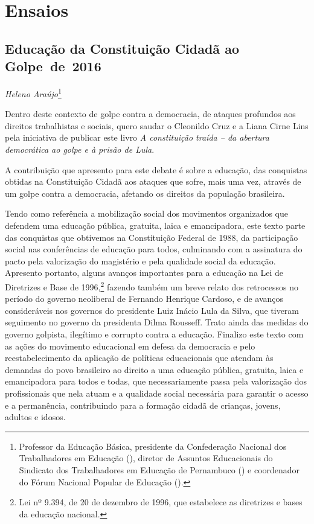 \part{Ensaios}

\chapter*{Educação da Constituição Cidadã ao Golpe~de~2016}


\begin{flushright}
\emph{Heleno Araújo}\footnote{Professor da Educação Básica, presidente da
  Confederação Nacional dos Trabalhadores em Educação (), diretor
  de Assuntos Educacionais do Sindicato dos Trabalhadores em Educação de
  Pernambuco () e coordenador do Fórum Nacional Popular de
  Educação ().}
\end{flushright}

Dentro deste contexto de golpe contra a democracia, de ataques profundos
aos direitos trabalhistas e sociais, quero saudar o Cleonildo Cruz e a
Liana Cirne Lins pela iniciativa de publicar este livro \emph{A constituição traída --
da abertura democrática ao golpe e à prisão de Lula}.

A contribuição que apresento para este debate é sobre a educação, das
conquistas obtidas na Constituição Cidadã aos ataques que sofre, mais uma vez,
através de um golpe contra a democracia, afetando os direitos da
população brasileira.

Tendo como referência a mobilização social dos movimentos organizados
que defendem uma educação pública, gratuita, laica e emancipadora, este
texto parte das conquistas que obtivemos na Constituição Federal de
1988, da participação social nas conferências de educação para todos,
culminando com a assinatura do pacto pela valorização do magistério e
pela qualidade social da educação. Apresento portanto, alguns avanços
importantes para a educação na Lei de Diretrizes e Base de
1996,\footnote{Lei nº 9.394, de 20 de dezembro de 1996, que
  estabelece as diretrizes e bases da educação nacional.} fazendo
também um breve relato dos retrocessos no período do governo neoliberal
de Fernando Henrique Cardoso, e de avanços consideráveis nos governos do
presidente Luiz Inácio Lula da Silva, que tiveram seguimento no governo da
presidenta Dilma Rousseff. Trato ainda das medidas do governo golpista,
ilegítimo e corrupto contra a educação. Finalizo este texto com as ações
do movimento educacional em defesa da democracia e pelo
reestabelecimento da aplicação de políticas educacionais que atendam às
demandas do povo brasileiro ao direito a uma educação pública,
gratuita, laica e emancipadora para todos e todas, que necessariamente
passa pela valorização dos profissionais que nela atuam e a qualidade
social necessária para garantir o acesso e a permanência, contribuindo
para a formação cidadã de crianças, jovens, adultos e idosos.

